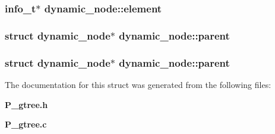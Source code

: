\subsubsection{\setlength{\rightskip}{0pt plus 5cm}info\_\-t$\ast$ dynamic\_\-node::element}\label{structdynamic__node_m0}


\subsubsection{\setlength{\rightskip}{0pt plus 5cm}struct dynamic\_\-node$\ast$ dynamic\_\-node::parent}\label{structdynamic__node_m5}


\subsubsection{\setlength{\rightskip}{0pt plus 5cm}struct dynamic\_\-node$\ast$ dynamic\_\-node::parent}\label{structdynamic__node_m2}




The documentation for this struct was generated from the following files:\begin{CompactItemize}
\item 
{\bf P\_\-gtree.h}\item 
{\bf P\_\-gtree.c}\end{CompactItemize}
